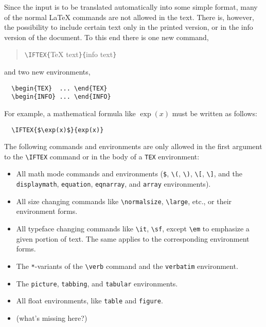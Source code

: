 Since the input is to be translated automatically into some simple
format, many of the normal \LaTeX{} commands are not allowed in the
text. There is, however, the possibility to include certain text only
in the printed version, or in the info version of the document. To
this end there is one new command,
\begin{quotation}
  \verb|\IFTEX{|\TeX{} text\verb|}{|info text\verb|}|
\end{quotation}
and two new environments,
\begin{verbatim}
  \begin{TEX}  ... \end{TEX}
  \begin{INFO} ... \end{INFO}
\end{verbatim}
For example, a mathematical formula like $\exp(x)$ must be written as
follows:
\begin{verbatim}
  \IFTEX{$\exp(x)$}{exp(x)}
\end{verbatim}
The following commands and environments are only allowed in the first
argument to the \verb|\IFTEX| command or in the body of a
\verb|TEX| environment:
\begin{itemize}
  \item All math mode commands and environments (\verb|$|, \verb|\(|,
        \verb|\)|, \verb|\[|, \verb|\]|, and the \verb|displaymath|,
        \verb|equation|, \verb|eqnarray|, and \verb|array|
        environments).
  \item All size changing commands like \verb|\normalsize|,
        \verb|\large|, etc., or their environment forms.
  \item All typeface changing commands like \verb|\it|, \verb|\sf|,
        except \verb|\em| to emphasize a given portion of text. The
        same applies to the corresponding environment forms.
  \item The \verb|*|-variants of the \verb|\verb| command and the 
        \verb|verbatim| environment.
  \item The \verb|picture|, \verb|tabbing|, and \verb|tabular|
        environments.
  \item All float environments, like \verb|table| and \verb|figure|.
  \item (what's missing here?)
\end{itemize}


